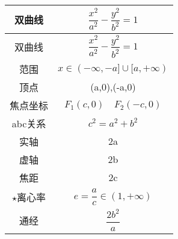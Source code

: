 \documentclass[lang=cn,10pt]{elegantbook}
\begin{document}
\begin{longtable}{|c|c|}
	\hline
	双曲线 & $\dfrac{x^{2}}{a^{2}}-\dfrac{y^{2}}{b^{2}}=1$  \\
	\hline
	\endfirsthead
	
	\hline
	双曲线 & $\dfrac{x^{2}}{a^{2}}-\dfrac{y^{2}}{b^{2}}=1$  \\
	\hline
	\endhead
	
	\hline
	\endfoot
	
	\hline
	\endlastfoot
	
	范围 & $ x \in ( -\infty ,-a] \cup [a,+\infty) $ \\
	\hline
	顶点 &  (a,0),(-a,0)\\
	\hline
	焦点坐标 & $F_{1}(c,0) \quad F_{2}(-c,0)$  \\
	\hline
	abc关系 & $c^{2}=a^{2}+b^{2}$  \\
	\hline
	实轴 & 2a  \\
	\hline
	虚轴 & 2b    \\
	\hline
	焦距 & 2c   \\
	\hline
	$\star$离心率 & $e=\dfrac{a}{c} \in (1,+\infty)$ \\
	\hline
	通经 & $\dfrac{2b^{2}}{a}$   \\
	\hline
\end{longtable}
\end{document}
